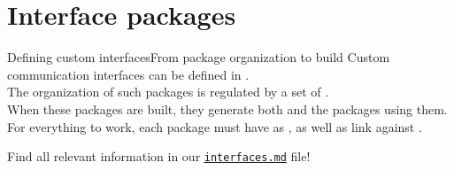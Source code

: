 
\section{Interface packages}

\begin{frame}{Defining custom interfaces}{From package organization to build}
  Custom communication interfaces can be defined in .\\
  \bigskip
  The organization of such packages is regulated by a set of .\\
  \bigskip
  When these packages are built, they generate both  and  the packages using them.\\
  \bigskip
  For everything to work, each package must have  as , as well as link against .\\
  \bigskip
  \begin{block}{}
    \centering
    Find all relevant information in our \href{https://github.com/IntelligentSystemsLabUTV/ros2-examples/blob/jazzy/interfaces.md}{\color{blue}\underline{\texttt{interfaces.md}}} file!
  \end{block}
\end{frame}
